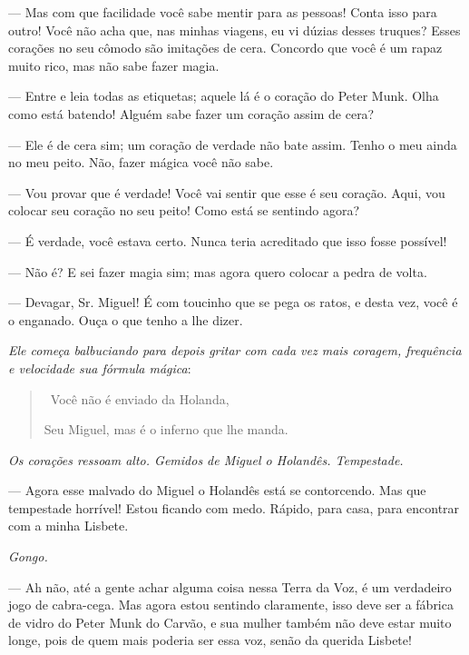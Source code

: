 \begin{myparindent}{0pt}
\begin{Parskip}
 --- Mas com que facilidade você sabe mentir para as
pessoas! Conta isso para outro! Você não acha que, nas minhas viagens,
eu vi dúzias desses truques? Esses corações no seu cômodo são imitações
de cera. Concordo que você é um rapaz muito rico, mas não sabe fazer
magia.

 --- Entre e leia todas as etiquetas; aquele lá é o
coração do Peter Munk. Olha como está batendo! Alguém sabe fazer um
coração assim de cera?

 --- Ele é de cera sim; um coração de verdade não
bate assim. Tenho o meu ainda no meu peito. Não, fazer mágica você não
sabe.

 --- Vou provar que é verdade! Você vai sentir que esse
é seu coração. Aqui, vou colocar seu coração no seu peito! Como está se
sentindo agora?

 --- É verdade, você estava certo. Nunca teria
acreditado que isso fosse possível!

 --- Não é? E sei fazer magia sim; mas agora quero
colocar a pedra de volta.

 --- Devagar, Sr. Miguel! É com toucinho que se pega
os ratos, e desta vez, você é o enganado. Ouça o que tenho a lhe dizer.

\emph{Ele começa balbuciando para depois gritar com cada vez mais
coragem, frequência e velocidade sua fórmula mágica}:

\begin{quote}
\quad \, Você não é enviado da Holanda,

Seu Miguel, mas é o inferno que lhe manda.
\end{quote}

\emph{Os corações ressoam alto. Gemidos de Miguel o Holandês.
Tempestade.}

 --- Agora esse malvado do Miguel o Holandês está se
contorcendo. Mas que tempestade horrível! Estou ficando com medo.
Rápido, para casa, para encontrar com a minha Lisbete.

\emph{Gongo.}

 --- Ah não, até a gente achar alguma coisa nessa Terra da Voz, é
um verdadeiro jogo de cabra-cega. Mas agora estou sentindo claramente,
isso deve ser a fábrica de vidro do Peter Munk do Carvão, e sua mulher
também não deve estar muito longe, pois de quem mais poderia ser essa
voz, senão da querida Lisbete!


\end{Parskip}
\end{myparindent}
